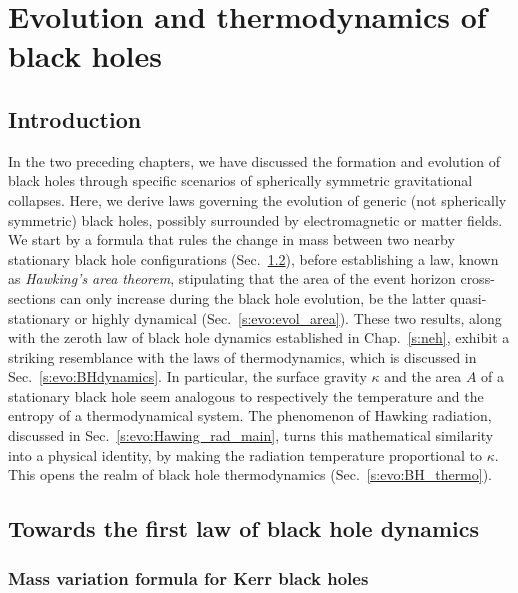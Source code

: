 \chapter{Evolution and thermodynamics of black holes}
\label{s:evo}

\minitoc

\section{Introduction}

In the two preceding chapters, we have discussed the formation and evolution
of black holes through specific scenarios of spherically symmetric gravitational
collapses. Here, we derive laws governing the evolution of generic (not spherically
symmetric) black holes, possibly surrounded by electromagnetic or matter fields.
We start by a formula that rules the change in mass between two nearby stationary
black hole configurations (Sec.~\ref{s:evo:towards_1st_law}), before
establishing a law, known as \emph{Hawking's area theorem}, stipulating that the area of
the event horizon
cross-sections can only increase during the black hole evolution,
be the latter quasi-stationary or highly dynamical (Sec.~\ref{s:evo:evol_area}).
These two results,
along with the zeroth law of black hole dynamics established in  Chap.~\ref{s:neh},
exhibit a striking resemblance with the laws of thermodynamics, which is
discussed in Sec.~\ref{s:evo:BHdynamics}. In particular, the surface gravity $\kappa$
and the area $A$ of a stationary black hole seem analogous to respectively the temperature and
the entropy of a thermodynamical system.
The phenomenon of Hawking radiation, discussed in Sec.~\ref{s:evo:Hawing_rad_main},
turns this mathematical similarity into a physical identity, by
making the radiation temperature proportional to $\kappa$. This opens the
realm of black hole thermodynamics (Sec.~\ref{s:evo:BH_thermo}).



\section{Towards the first law of black hole dynamics} \label{s:evo:towards_1st_law}

\subsection{Mass variation formula for Kerr black holes} \label{s:evo:mass_variation_Kerr}

